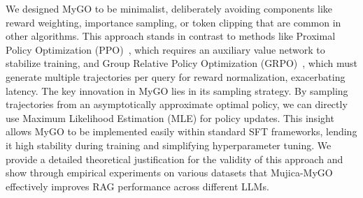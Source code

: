 

We designed MyGO to be minimalist, deliberately avoiding components like reward weighting, importance sampling, or token clipping that are common in other algorithms.
This approach stands in contrast to methods like Proximal Policy Optimization (PPO)~\cite{schulman2017proximal}, which requires an auxiliary value network to stabilize training, and Group Relative Policy Optimization (GRPO)~\cite{shao2024deepseekmath}, which must generate multiple trajectories per query for reward normalization, exacerbating latency.
The key innovation in MyGO lies in its sampling strategy. By sampling trajectories from an asymptotically approximate optimal policy, we can directly use Maximum Likelihood Estimation (MLE) for policy updates.
This insight allows MyGO to be implemented easily within standard SFT frameworks, lending it high stability during training and simplifying hyperparameter tuning.
We provide a detailed theoretical justification for the validity of this approach and show through empirical experiments on various datasets that Mujica-MyGO effectively improves RAG performance across different LLMs.



